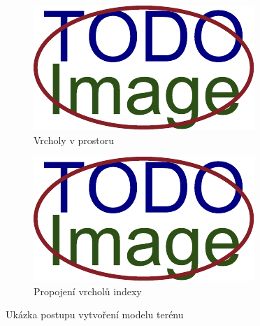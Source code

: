 \begin{figure}[H]
	\centering
	\begin{subfigure}{0.32\textwidth}
		\includegraphics[width=\textwidth]{obrazky-figures/placeholder.pdf}
		\caption{Vrcholy v prostoru}
		\label{fig:terén:vrcholy}
	\end{subfigure}%
	\hspace{0.02\textwidth}%
	\begin{subfigure}{0.32\textwidth}
		\includegraphics[width=\textwidth]{obrazky-figures/placeholder.pdf}
		\caption{Propojení vrcholů indexy}
		\label{fig:terén:trojůhelníky}
	\end{subfigure}
	\caption{Ukázka postupu vytvoření modelu terénu}
	\label{fig:terén}
\end{figure}



